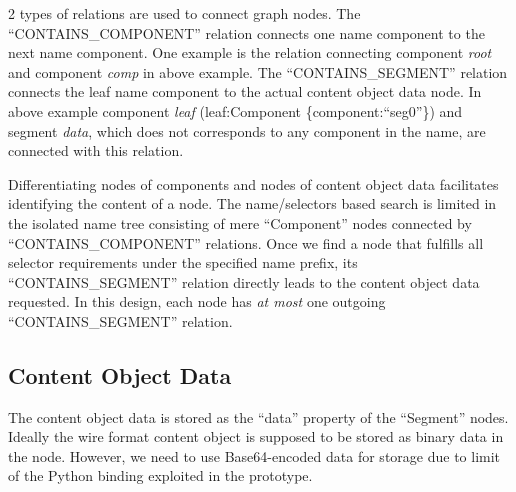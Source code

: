 2 types of relations are used to connect graph nodes. The ``CONTAINS\_COMPONENT'' relation connects one name component to the next name component. One example is the relation connecting component \emph{root} and component \emph{comp} in above example. The ``CONTAINS\_SEGMENT'' relation connects the leaf name component  to the actual content object data node. In above example component \emph{leaf} (leaf:Component \{component:``seg0''\}) and segment \emph{data}, which does not corresponds to any component in the name, are connected with this relation.

Differentiating nodes of components and nodes of content object data facilitates identifying the content of a node. The name/selectors based search is limited in the isolated name tree consisting of mere ``Component'' nodes connected by ``CONTAINS\_COMPONENT'' relations. Once we find a node that fulfills all selector requirements under the specified name prefix, its ``CONTAINS\_SEGMENT'' relation directly leads to the content object data requested. In this design, each node has \emph{at most} one outgoing ``CONTAINS\_SEGMENT'' relation.

\subsection{Content Object Data}

The content object data is stored as the ``data'' property of the ``Segment'' nodes. Ideally the wire format content object is supposed to be stored as binary data in the node. However, we need to use Base64-encoded data for storage due to limit of the Python binding exploited in the prototype. 